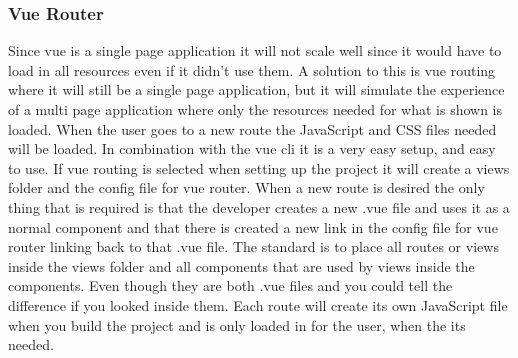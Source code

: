 \subsubsection{Vue Router}
Since vue is a single page application it will not scale well since it would have to load in all resources even if it didn't use them. A solution to this is vue routing where it will still be a single page application, but it will simulate the experience of a multi page application where only the resources needed for what is shown is loaded. When the user goes to a new route the JavaScript and CSS files needed will be loaded. In combination with the vue cli it is a very easy setup, and easy to use. If vue routing is selected when setting up the project it will create a views folder and the config file for vue router. When a new route is desired the only thing that is required is that the developer creates a new .vue file and uses it as a normal component and that there is created a new link in the config file for vue router linking back to that .vue file. The standard is to place all routes or views inside the views folder and all components that are used by views inside the components. Even though they are both .vue files and you could tell the difference if you looked inside them. Each route will create its own JavaScript file when you build the project and is only loaded in for the user, when the its needed.
